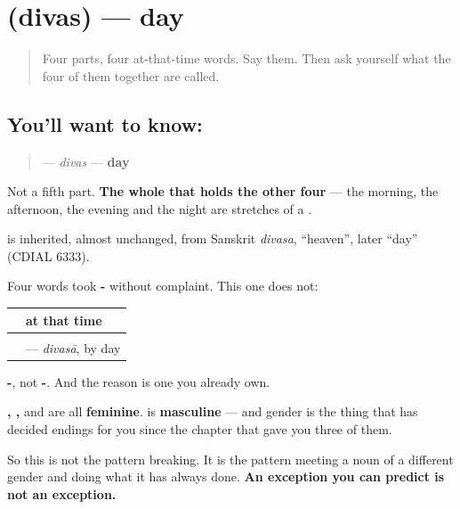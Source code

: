\section[\texorpdfstring{\mr{दिवस} (divas)}{दिवस (divas)}]{ (divas) — day}

\label{lesson:MR-C66-divas}



\begin{quote}
Four parts, four at-that-time words. Say them. Then ask yourself what the four of them together are called.
\end{quote}

\subsection*{You'll want to know: }
\begin{quote}
\textbf{} — \emph{divas} — \textbf{day}
\end{quote}

Not a fifth part. \textbf{The whole that holds the other four} — the morning, the afternoon, the evening and the night are stretches of a .

\begin{cousinweb}
\textbf{} is inherited, almost unchanged, from Sanskrit \emph{divasa}, \textquotedblleft{}heaven\textquotedblright{}, later \textquotedblleft{}day\textquotedblright{} (CDIAL 6333).
\end{cousinweb}

\begin{grammarlens}[title={Grammar Lens: the one that will not take -\mr{ी}}]
Four words took \textbf{-} without complaint. This one does not:

\noindent
\begin{tabularx}{\linewidth}{@{}>{\raggedright\arraybackslash}X>{\raggedright\arraybackslash}X@{}}
\toprule
\textbf{} & \textbf{at that time} \\
\midrule
\textbf{\mr{रात्र}} & \textbf{\mr{रात्री}} \\
\textbf{\mr{दिवस}} & \textbf{\mr{दिवसा}} — \emph{divasā}, by day \\
\bottomrule
\end{tabularx}

\textbf{-}, not \textbf{-}. And the reason is one you already own.

\textbf{, , } and \textbf{} are all \textbf{feminine}. \textbf{} is \textbf{masculine} — and gender is the thing that has decided endings for you since the chapter that gave you three of them.

So this is not the pattern breaking. It is the pattern meeting a noun of a different gender and doing what it has always done. \textbf{An exception you can predict is not an exception.}
\end{grammarlens}

